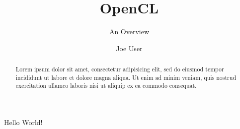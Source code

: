 \documentclass{scrartcl}
\title{OpenCL}
\subtitle{An Overview}
\author{Joe User}
\begin{document}
\maketitle

\begin{abstract}
Lorem ipsum dolor sit amet, consectetur adipisicing elit, sed do eiusmod tempor incididunt ut labore et dolore magna aliqua. Ut enim ad minim veniam, quis nostrud exercitation ullamco laboris nisi ut aliquip ex ea commodo consequat.
\end{abstract}

Hello World!
\end{document}
